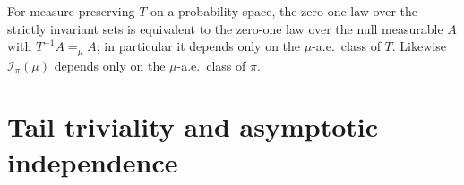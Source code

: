 \begin{corollary}
    \label{cor:ext-preergodic-ae}
    \leanok

    For measure-preserving $T$ on a probability space, the zero-one law over the strictly invariant
    sets is equivalent to the zero-one law over the null measurable $A$ with $T^{-1}A =_\mu A$; in
    particular it depends only on the $\mu$-a.e.\ class of $T$. Likewise $\mathcal I_\pi(\mu)$
    depends only on the $\mu$-a.e.\ class of $\pi$.
\end{corollary}

\section{Tail triviality and asymptotic independence}

